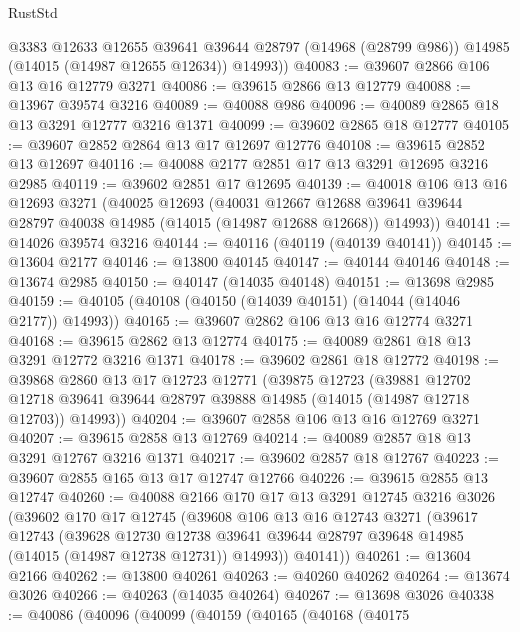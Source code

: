 \begin{lexlean}{RustStd}
\begin{coremodule}
        @3383
        @12633
        @12655
        @39641
        @39644
        @28797
        (@14968 (@28799 @986))
        @14985
        (@14015 (@14987 @12655 @12634))
        @14993))
@40083 := @39607 @2866 @106 @13 @16 @12779 @3271
@40086 := @39615 @2866 @13 @12779
@40088 := @13967 @39574 @3216
@40089 := @40088 @986
@40096 := @40089 @2865 @18 @13 @3291 @12777 @3216 @1371
@40099 := @39602 @2865 @18 @12777
@40105 := @39607 @2852 @2864 @13 @17 @12697 @12776
@40108 := @39615 @2852 @13 @12697
@40116 := @40088 @2177 @2851 @17 @13 @3291 @12695 @3216 @2985
@40119 := @39602 @2851 @17 @12695
@40139 := @40018
    @106
    @13
    @16
    @12693
    @3271
    (@40025
      @12693
      (@40031
        @12667
        @12688
        @39641
        @39644
        @28797
        @40038
        @14985
        (@14015 (@14987 @12688 @12668))
        @14993))
@40141 := @14026 @39574 @3216
@40144 := @40116 (@40119 (@40139 @40141))
@40145 := @13604 @2177
@40146 := @13800 @40145
@40147 := @40144 @40146
@40148 := @13674 @2985
@40150 := @40147 (@14035 @40148)
@40151 := @13698 @2985
@40159 := @40105 (@40108 (@40150 (@14039 @40151) (@14044 (@14046 @2177)) @14993))
@40165 := @39607 @2862 @106 @13 @16 @12774 @3271
@40168 := @39615 @2862 @13 @12774
@40175 := @40089 @2861 @18 @13 @3291 @12772 @3216 @1371
@40178 := @39602 @2861 @18 @12772
@40198 := @39868
    @2860
    @13
    @17
    @12723
    @12771
    (@39875
      @12723
      (@39881
        @12702
        @12718
        @39641
        @39644
        @28797
        @39888
        @14985
        (@14015 (@14987 @12718 @12703))
        @14993))
@40204 := @39607 @2858 @106 @13 @16 @12769 @3271
@40207 := @39615 @2858 @13 @12769
@40214 := @40089 @2857 @18 @13 @3291 @12767 @3216 @1371
@40217 := @39602 @2857 @18 @12767
@40223 := @39607 @2855 @165 @13 @17 @12747 @12766
@40226 := @39615 @2855 @13 @12747
@40260 := @40088
    @2166
    @170
    @17
    @13
    @3291
    @12745
    @3216
    @3026
    (@39602
      @170
      @17
      @12745
      (@39608
        @106
        @13
        @16
        @12743
        @3271
        (@39617
          @12743
          (@39628
            @12730
            @12738
            @39641
            @39644
            @28797
            @39648
            @14985
            (@14015 (@14987 @12738 @12731))
            @14993))
        @40141))
@40261 := @13604 @2166
@40262 := @13800 @40261
@40263 := @40260 @40262
@40264 := @13674 @3026
@40266 := @40263 (@14035 @40264)
@40267 := @13698 @3026
@40338 := @40086
    (@40096
      (@40099
        (@40159
          (@40165
            (@40168
              (@40175

\end{coremodule}
\end{lexlean}
